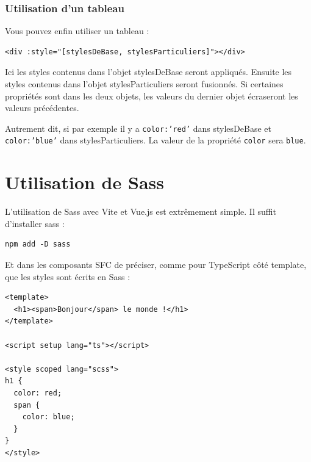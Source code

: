 \documentclass{article}
\begin{document}
\subsubsection{Utilisation d'un tableau}
Vous pouvez enfin utiliser un tableau :
\begin{verbatim}
<div :style="[stylesDeBase, stylesParticuliers]"></div>
\end{verbatim}
Ici les styles contenus dans l'objet {\color{monOrange}stylesDeBase} seront appliqués. Ensuite les styles contenus dans l'objet {\color{monOrange}stylesParticuliers} seront fusionnés. Si certaines propriétés sont dans les deux objets, les valeurs du dernier objet écraseront les valeurs précédentes.

Autrement dit, si par exemple il y a {\tt color:'red'} dans {\color{monOrange}stylesDeBase} et {\tt color:'blue'} dans {\color{monOrange}stylesParticuliers}. La valeur de la propriété {\tt color} sera {\tt blue}.


\section{Utilisation de {\color{monOrange}Sass}}
L'utilisation de {\color{monOrange}Sass} avec {\color{monOrange}Vite} et {\color{monOrange}Vue.js} est extrêmement simple. Il suffit d'installer {\color{monOrange}sass} :
\begin{verbatim}
npm add -D sass
\end{verbatim}
Et dans les composants {\color{monOrange}SFC} de préciser, comme pour {\color{monOrange}TypeScript} côté {\color{monOrange}template}, que les styles sont écrits en {\color{monOrange}Sass} :
\begin{verbatim}
<template>
  <h1><span>Bonjour</span> le monde !</h1>
</template>

<script setup lang="ts"></script>

<style scoped lang="scss">
h1 {
  color: red;
  span {
    color: blue;
  }
}
</style>
\end{verbatim}

\end{document}
